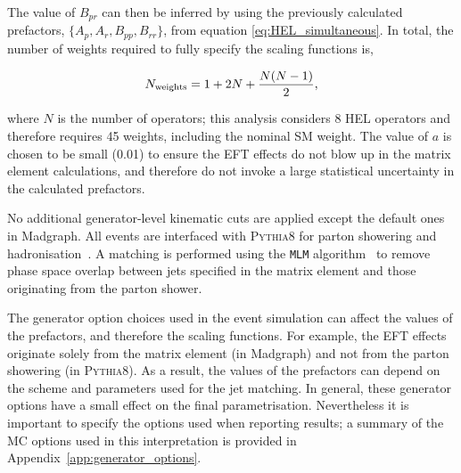 \noindent
The value of $B_{pr}$ can then be inferred by using the previously calculated prefactors, $\{A_p,A_r,B_{pp},B_{rr}\}$, from equation \ref{eq:HEL_simultaneous}. In total, the number of weights required to fully specify the scaling functions is,

\begin{equation}
    N_{\rm{weights}} = 1 + 2N + \frac{N(N-1)}{2},
\end{equation}

\noindent
where $N$ is the number of operators; this analysis considers 8 HEL operators and therefore requires 45 weights, including the nominal SM weight. The value of $a$ is chosen to be small (0.01) to ensure the EFT effects do not blow up in the matrix element calculations, and therefore do not invoke a large statistical uncertainty in the calculated prefactors.

No additional generator-level kinematic cuts are applied except the default ones in Madgraph. All events are interfaced with \textsc{Pythia8} for parton showering and hadronisation~\cite{Sjostrand:2014zea}. A matching is performed using the \texttt{MLM} algorithm~\cite{Alwall:2007fs} to remove phase space overlap between jets specified in the matrix element and those originating from the parton shower.

The generator option choices used in the event simulation can affect the values of the prefactors, and therefore the scaling functions. For example, the EFT effects originate solely from the matrix element (in Madgraph) and not from the parton showering (in \textsc{Pythia8}). As a result, the values of the prefactors can depend on the scheme and parameters used for the jet matching. In general, these generator options have a small effect on the final parametrisation. Nevertheless it is important to specify the options used when reporting results; a summary of the MC options used in this interpretation is provided in Appendix~\ref{app:generator_options}.

